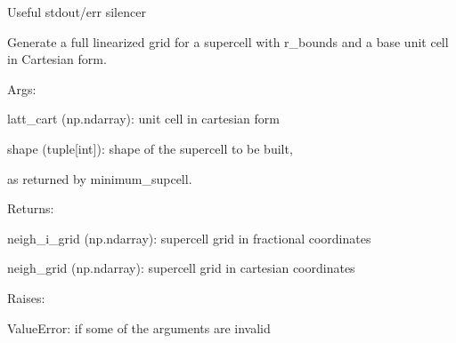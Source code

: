 \documentclass[letterpaper,10pt,english]{sphinxmanual}
\begin{document}
\begin{fulllineitems}
\label{doctree/soprano.utils:soprano.utils.silence_stdio}
Useful stdout/err silencer

\end{fulllineitems}


\begin{fulllineitems}
\label{doctree/soprano.utils:soprano.utils.supcell_gridgen}
Generate a full linearized grid for a supercell with r\_bounds
and a base unit cell in Cartesian form.

\begin{DUlineblock}{0em}
\item[] Args:
\item[]
\begin{DUlineblock}{\DUlineblockindent}
\item[] latt\_cart (np.ndarray): unit cell in cartesian form
\item[] shape (tuple{[}int{]}):  shape of the supercell to be built,
\item[]
\begin{DUlineblock}{\DUlineblockindent}
\item[] as returned by minimum\_supcell.
\end{DUlineblock}
\end{DUlineblock}
\end{DUlineblock}

\begin{DUlineblock}{0em}
\item[] Returns:
\item[]
\begin{DUlineblock}{\DUlineblockindent}
\item[] neigh\_i\_grid (np.ndarray): supercell grid in fractional coordinates
\item[] neigh\_grid (np.ndarray): supercell grid in cartesian coordinates
\end{DUlineblock}
\end{DUlineblock}

\begin{DUlineblock}{0em}
\item[] Raises:
\item[]
\begin{DUlineblock}{\DUlineblockindent}
\item[] ValueError: if some of the arguments are invalid
\end{DUlineblock}
\end{DUlineblock}

\end{fulllineitems}
\end{document}
